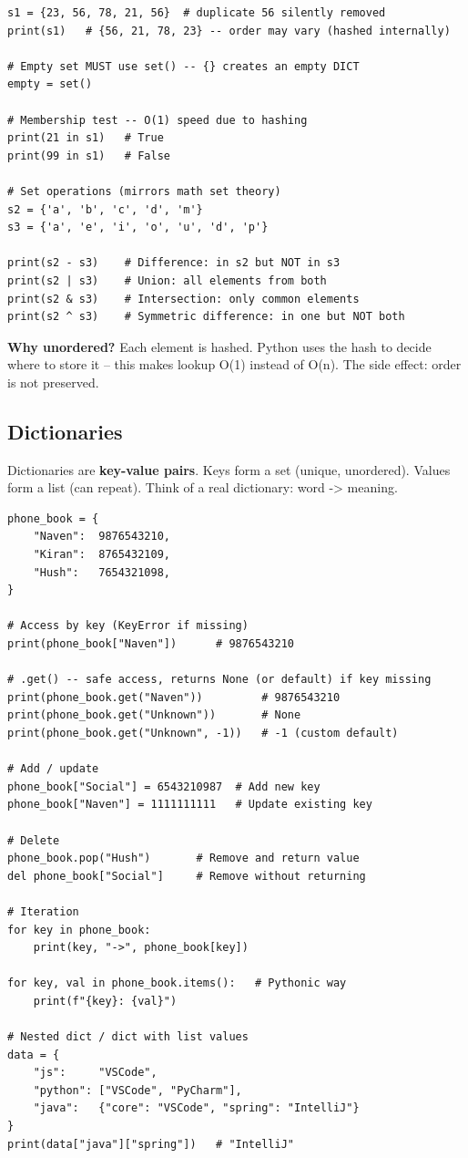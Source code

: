 \documentclass[12pt,a4paper]{article}
\begin{document}
\begin{lstlisting}
s1 = {23, 56, 78, 21, 56}  # duplicate 56 silently removed
print(s1)   # {56, 21, 78, 23} -- order may vary (hashed internally)

# Empty set MUST use set() -- {} creates an empty DICT
empty = set()

# Membership test -- O(1) speed due to hashing
print(21 in s1)   # True
print(99 in s1)   # False

# Set operations (mirrors math set theory)
s2 = {'a', 'b', 'c', 'd', 'm'}
s3 = {'a', 'e', 'i', 'o', 'u', 'd', 'p'}

print(s2 - s3)    # Difference: in s2 but NOT in s3
print(s2 | s3)    # Union: all elements from both
print(s2 & s3)    # Intersection: only common elements
print(s2 ^ s3)    # Symmetric difference: in one but NOT both
\end{lstlisting}

\begin{notebox}
\textbf{Why unordered?} Each element is hashed. Python uses the hash to decide where to store it -- this makes lookup O(1) instead of O(n). The side effect: order is not preserved.
\end{notebox}

\subsection{Dictionaries}

Dictionaries are \textbf{key-value pairs}. Keys form a set (unique, unordered). Values form a list (can repeat). Think of a real dictionary: word -> meaning.

\begin{lstlisting}
phone_book = {
    "Naven":  9876543210,
    "Kiran":  8765432109,
    "Hush":   7654321098,
}

# Access by key (KeyError if missing)
print(phone_book["Naven"])      # 9876543210

# .get() -- safe access, returns None (or default) if key missing
print(phone_book.get("Naven"))         # 9876543210
print(phone_book.get("Unknown"))       # None
print(phone_book.get("Unknown", -1))   # -1 (custom default)

# Add / update
phone_book["Social"] = 6543210987  # Add new key
phone_book["Naven"] = 1111111111   # Update existing key

# Delete
phone_book.pop("Hush")       # Remove and return value
del phone_book["Social"]     # Remove without returning

# Iteration
for key in phone_book:
    print(key, "->", phone_book[key])

for key, val in phone_book.items():   # Pythonic way
    print(f"{key}: {val}")

# Nested dict / dict with list values
data = {
    "js":     "VSCode",
    "python": ["VSCode", "PyCharm"],
    "java":   {"core": "VSCode", "spring": "IntelliJ"}
}
print(data["java"]["spring"])   # "IntelliJ"
\end{lstlisting}
\end{document}
